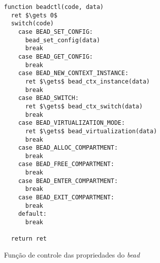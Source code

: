 \begin{pseudocode}

\begin{lstlisting}[language=pseudocode, style=pseudocode]
function beadctl(code, data)
  ret $\gets 0$
  switch(code)
    case BEAD_SET_CONFIG:
      bead_set_config(data)
      break
    case BEAD_GET_CONFIG:
      break
    case BEAD_NEW_CONTEXT_INSTANCE:
      ret $\gets$ bead_ctx_instance(data)
      break
    case BEAD_SWITCH:
      ret $\gets$ bead_ctx_switch(data)
      break
    case BEAD_VIRTUALIZATION_MODE:
      ret $\gets$ bead_virtualization(data)
      break
    case BEAD_ALLOC_COMPARTMENT:
      break
    case BEAD_FREE_COMPARTMENT:
      break
    case BEAD_ENTER_COMPARTMENT:
      break
    case BEAD_EXIT_COMPARTMENT:
      break
    default:
      break

  return ret

\end{lstlisting}

  \caption{Função de controle das propriedades do \emph{bead}}
  \label{alg:ctlbead}
\end{pseudocode}
